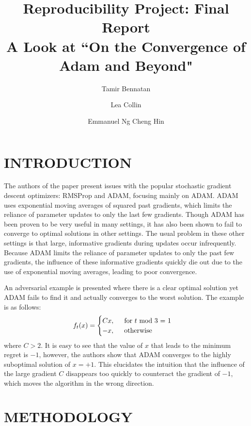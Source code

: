\documentclass[letterpaper, 10 pt, conference]{ieeeconf}  %
\title{\LARGE \bf
Reproducibility Project: Final Report \\
\large A Look at ``On the Convergence of Adam and Beyond"
}
\author[1]{Tamir Bennatan}
\author[2]{Lea Collin}
\author[3]{Emmanuel Ng Cheng Hin}
\affil[1]{ID: 260614526, email: tamir.bennatan@mail.mcgill.ca}
\affil[2]{ID: 260618407, email: lea.collin@mail.mcgill.ca}
\affil[3]{ID: 260615964, email: emmanuel.ngchenghin@mail.mcgill.ca}
\begin{document}
\maketitle
\thispagestyle{empty}
\pagestyle{empty}




\section{INTRODUCTION}

	The authors of the paper present issues with the popular stochastic gradient descent optimizers: RMSProp and ADAM, focusing mainly on ADAM. ADAM uses exponential moving averages of squared past gradients, which limits the reliance of parameter updates to only the last few gradients. Though ADAM has been proven to be very useful in many settings, it has also been shown to fail to converge to optimal solutions in other settings. The usual problem in these other settings is that large, informative gradients during updates occur infrequently. Because ADAM limits the reliance of parameter updates to only the past few gradients, the influence of these informative gradients quickly die out due to the use of exponential moving averages, leading to poor convergence. \par
	An adversarial example is presented where there is a clear optimal solution yet ADAM fails to find it and actually converges to the worst solution. The example is as follows:
\[
    f_{t}(x) = 
    \begin{cases}
     	Cx, \hspace{5mm} \text{for } t \text{ mod 3 = 1} \\
        -x, \hspace{5mm} \text{otherwise}
    \end{cases}
\]
where $C>2$. It is easy to see that the value of $x$ that leads to the minimum regret is $-1$, however, the authors show that ADAM converges to the highly suboptimal solution of $x = +1$. This elucidates the intuition that the influence of the large gradient $C$ disappears too quickly to counteract the gradient of $-1$, which moves the algorithm in the wrong direction. 

\section{METHODOLOGY}
\end{document}
